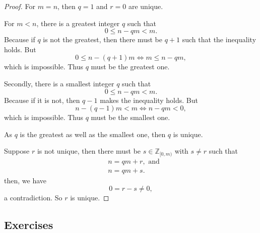 \begin{proof}
	For $m = n$, then $q = 1$ and $r = 0$ are unique.
	
	For $m < n$, there is a greatest integer $q$ such that
	$$
	0 \le n - qm < m.
	$$
	Because if $q$ is not the greatest, then there must be $q + 1$ such that the inequality holds. But
	$$
	0 \le n - (q + 1)m \iff m \le n - qm,
	$$
	which is impossible. Thus $q$ must be the greatest one.
	
	Secondly, there is a smallest integer $q$ such that
	$$
	0 \le n - qm < m.
	$$
	Because if it is not, then $q - 1$ makes the inequality holds. But
	$$
	n - (q - 1) m < m \iff n - qm < 0,
	$$
	which is impossible. Thus $q$ must be the smallest one.
	
	As $q$ is the greatest as well as the smallest one, then $q$ is unique.
	
	Suppose $r$ is not unique, then there must be $s \in \mathbb Z_{[0,m)}$ with $s \ne r$ such that
	$$
	\begin{aligned}
		& n = qm + r, \text{ and}\\
		& n = qm + s.
	\end{aligned}
	$$
	then, we have
	$$
	0 = r - s \ne 0,
	$$
	a contradiction. So $r$ is unique.\end{proof}

\subsection*{Exercises}

